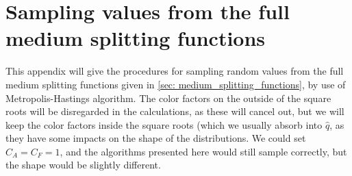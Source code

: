\documentclass[main.tex]{subfiles}
\begin{document}
\section{Sampling values from the full medium splitting functions}
This appendix will give the procedures for sampling random values from the full medium splitting functions given in \autoref{sec: medium_splitting_functions}, by use of Metropolis-Hastings algorithm. The color factors on the outside of the square roots will be disregarded in the calculations, as these will cancel out, but we will keep the color factors inside the square roots (which we usually absorb into \(\hat q\), as they have some impacts on the shape of the distributions. We could set \(C_A=C_F=1\), and the algorithms presented here would still sample correctly, but the shape would be slightly different. 
\end{document}
